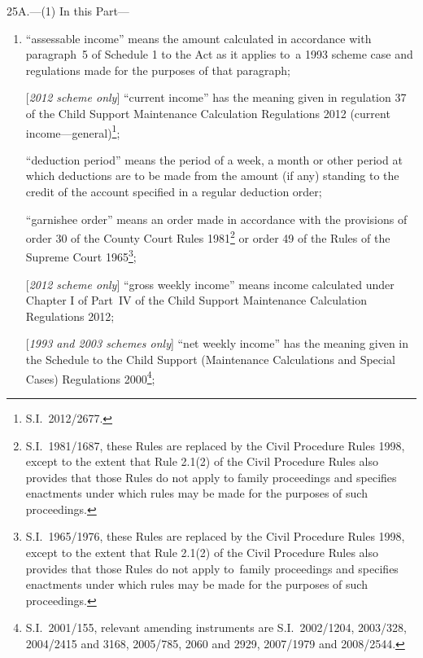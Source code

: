 \documentclass[12pt,a4paper]{article}
\begin{document}
25A.---(1)  In this Part—
\begin{enumerate}\item[]
“assessable income” means the amount calculated in accordance with paragraph~5 of Schedule 1 to the Act as it applies to~a 1993 scheme case and regulations made for the purposes of that paragraph;

[\emph{2012 scheme only}] “current income” has the meaning given in regulation 37 of the Child Support Maintenance Calculation Regulations 2012 (current income---general)\footnote{S.I.~2012/2677.};

“deduction period” means the period of a week, a month or other period at which deductions are to be made from the amount (if any) standing to the credit of the account specified in a regular deduction order;

“garnishee order” means an order made in accordance with the provisions of order 30 of the County Court Rules 1981\footnote{S.I.~1981/1687, these Rules are replaced by the Civil Procedure Rules 1998, except to the extent that Rule 2.1(2) of the Civil Procedure Rules also provides that those Rules do not apply to family proceedings and specifies enactments under which rules may be made for the purposes of such proceedings.} or order 49 of the Rules of the Supreme Court 1965\footnote{S.I.~1965/1976, these Rules are replaced by the Civil Procedure Rules 1998, except to the extent that Rule 2.1(2) of the Civil Procedure Rules also provides that those Rules do not apply to~family proceedings and specifies enactments under which rules may be made for the purposes of such proceedings.};

[\emph{2012 scheme only}] “gross weekly income” means income calculated under Chapter I of Part~IV of the Child Support Maintenance Calculation Regulations 2012;

[\emph{1993 and 2003 schemes only}] “net weekly income” has the meaning given in the Schedule to the Child Support (Maintenance Calculations and Special Cases) Regulations 2000\footnote{S.I.~2001/155, relevant amending instruments are S.I.~2002/1204, 2003/328, 2004/2415 and 3168, 2005/785, 2060 and 2929, 2007/1979 and 2008/2544.};


\end{enumerate}
\end{document}
